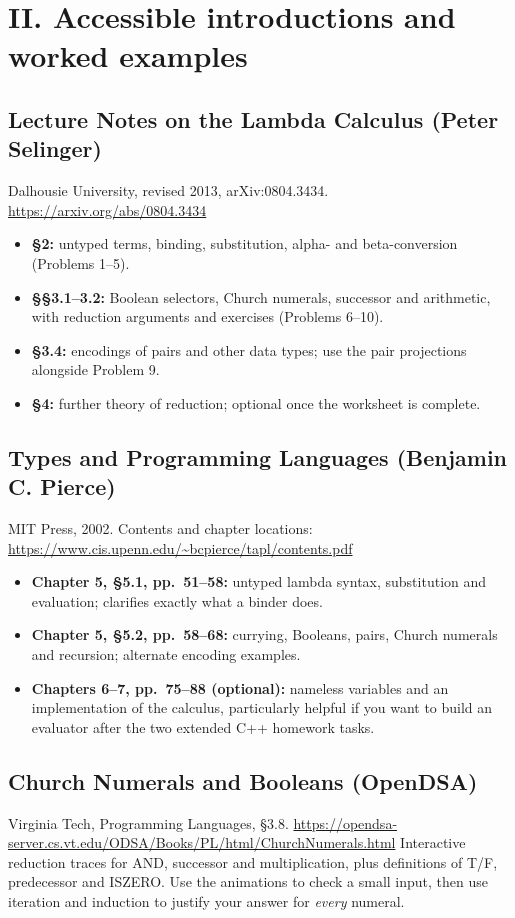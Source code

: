 \documentclass[11pt]{article}
\begin{document}
\section*{II. Accessible introductions and worked examples}
\subsection*{Lecture Notes on the Lambda Calculus (Peter Selinger)}
Dalhousie University, revised 2013, arXiv:0804.3434. \url{https://arxiv.org/abs/0804.3434}
\begin{itemize}
  \item \textbf{\S2:} untyped terms, binding, substitution, alpha- and beta-conversion (Problems 1--5).
  \item \textbf{\S\S3.1--3.2:} Boolean selectors, Church numerals, successor and arithmetic, with reduction arguments and exercises (Problems 6--10).
  \item \textbf{\S3.4:} encodings of pairs and other data types; use the pair projections alongside Problem 9.
  \item \textbf{\S4:} further theory of reduction; optional once the worksheet is complete.
\end{itemize}

\newpage
\subsection*{Types and Programming Languages (Benjamin C. Pierce)}
MIT Press, 2002. Contents and chapter locations: \url{https://www.cis.upenn.edu/~bcpierce/tapl/contents.pdf}
\begin{itemize}
  \item \textbf{Chapter 5, \S5.1, pp.~51--58:} untyped lambda syntax, substitution and evaluation; clarifies exactly what a binder does.
  \item \textbf{Chapter 5, \S5.2, pp.~58--68:} currying, Booleans, pairs, Church numerals and recursion; alternate encoding examples.
  \item \textbf{Chapters 6--7, pp.~75--88 (optional):} nameless variables and an implementation of the calculus, particularly helpful if you want to build an evaluator after the two extended C++ homework tasks.
\end{itemize}

\subsection*{Church Numerals and Booleans (OpenDSA)}
Virginia Tech, Programming Languages, \S3.8. \url{https://opendsa-server.cs.vt.edu/ODSA/Books/PL/html/ChurchNumerals.html}
Interactive reduction traces for AND, successor and multiplication, plus definitions of T/F, predecessor and ISZERO. Use the animations to check a small input, then use iteration and induction to justify your answer for \emph{every} numeral.
\end{document}
